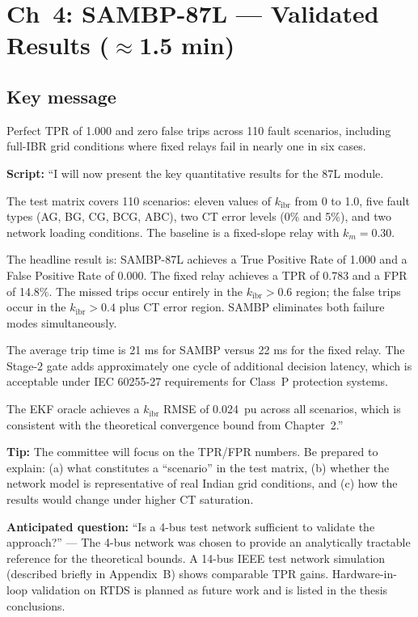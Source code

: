 \documentclass[11pt,a4paper]{article}
\newcommand{\script}[1]{\begin{scriptbox}\textbf{Script:} #1\end{scriptbox}}
\newcommand{\tip}[1]{\begin{tipbox}\textbf{Tip:} #1\end{tipbox}}
\newcommand{\anticipate}[1]{\begin{warnbox}\textbf{Anticipated question:} #1\end{warnbox}}
\newcommand{\kibr}{k_{\mathrm{ibr}}}
\begin{document}
\section{Ch~4: SAMBP-87L --- Validated Results \hfill\normalfont\small($\approx$1.5 min)}
\label{slide:87l_results}

\subsection*{Key message}
Perfect TPR of 1.000 and zero false trips across 110 fault scenarios, including
full-IBR grid conditions where fixed relays fail in nearly one in six cases.

\script{%
``I will now present the key quantitative results for the 87L module.

The test matrix covers 110 scenarios: eleven values of $\kibr$ from 0 to 1.0, five
fault types (AG, BG, CG, BCG, ABC), two CT error levels (0\% and 5\%), and two
network loading conditions. The baseline is a fixed-slope relay with $k_m = 0.30$.

The headline result is: SAMBP-87L achieves a True Positive Rate of 1.000 and a False
Positive Rate of 0.000. The fixed relay achieves a TPR of 0.783 and a FPR of 14.8\%.
The missed trips occur entirely in the $\kibr > 0.6$ region; the false trips occur in
the $\kibr > 0.4$ plus CT error region. SAMBP eliminates both failure modes simultaneously.

The average trip time is 21 ms for SAMBP versus 22 ms for the fixed relay. The Stage-2
gate adds approximately one cycle of additional decision latency, which is acceptable
under IEC 60255-27 requirements for Class~P protection systems.

The EKF oracle achieves a $\kibr$ RMSE of 0.024~pu across all scenarios, which is
consistent with the theoretical convergence bound from Chapter~2.''%
}

\tip{The committee will focus on the TPR/FPR numbers. Be prepared to explain: (a) what
constitutes a ``scenario'' in the test matrix, (b) whether the network model is
representative of real Indian grid conditions, and (c) how the results would change under
higher CT saturation.}

\anticipate{``Is a 4-bus test network sufficient to validate the approach?'' ---
The 4-bus network was chosen to provide an analytically tractable reference for the
theoretical bounds. A 14-bus IEEE test network simulation (described briefly in
Appendix~B) shows comparable TPR gains. Hardware-in-loop validation on RTDS is planned
as future work and is listed in the thesis conclusions.}
\end{document}
